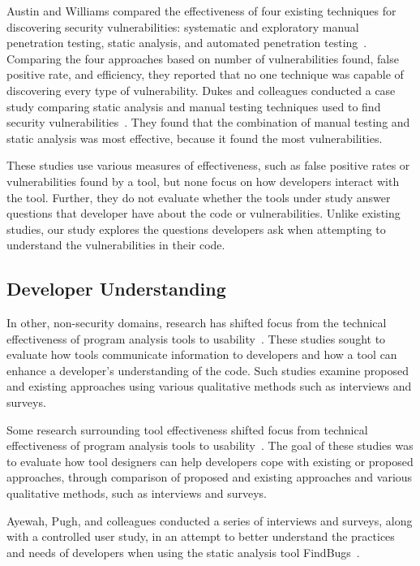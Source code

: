 \documentclass[conference]{IEEEtran}
\begin{document}
Austin and Williams compared the effectiveness of four existing techniques for discovering security vulnerabilities: systematic and exploratory manual  penetration testing, static analysis, and automated penetration testing~\cite{austin2011one}. 
Comparing the four approaches based on number of vulnerabilities found, false positive rate, and efficiency, they reported that no one technique was capable of discovering every type of vulnerability. 
Dukes and colleagues conducted a case study comparing static analysis and manual testing techniques used to find security vulnerabilities~\cite{dukes2013case}. 
They found that the combination of manual testing and static analysis was most effective, because it found the most vulnerabilities.


These studies use various measures of effectiveness, such as false positive rates or vulnerabilities found by a tool, but none focus on how developers interact with the tool. Further, they do not evaluate whether the tools under study answer questions that developer have about the code or vulnerabilities. 
Unlike existing studies, our study explores the questions developers ask when attempting to understand the vulnerabilities in their code.

\subsection{Developer Understanding}
\label{understanding}
In other, non-security domains, research has shifted focus from the technical effectiveness of program analysis tools to usability~\cite{johnson2013don, ayewah2008using, khoo2008path}. 
These studies sought to evaluate how tools communicate information to developers and how a tool can enhance a developer's understanding of the code. Such studies examine proposed and existing approaches using various qualitative methods such as interviews and surveys. 

Some research surrounding tool effectiveness shifted focus from technical effectiveness of program analysis tools to usability~\cite{johnson2013don, ayewah2008using, khoo2008path}. The goal of these studies was to evaluate how tool designers can help developers cope with existing or proposed approaches, through comparison of proposed and existing approaches and various qualitative methods, such as interviews and surveys.

Ayewah, Pugh, and colleagues conducted a series of interviews and surveys, along with a controlled user study, in an attempt to better understand the practices and needs of developers when using the static analysis tool FindBugs~\cite{ayewah2008report, ayewah2008using}.
\end{document}
